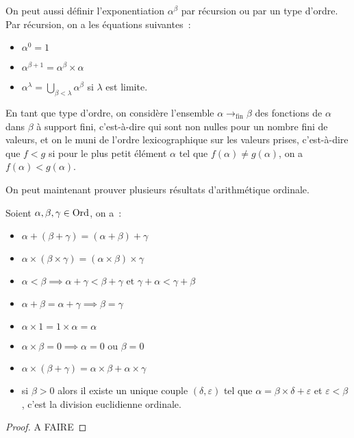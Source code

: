 On peut aussi définir l'exponentiation $\alpha^\beta$ par récursion ou par un
type d'ordre. Par récursion, on a les équations suivantes~:
\begin{itemize}
\item $\alpha^0 = 1$
\item $\alpha^{\beta+1} = \alpha^\beta \times \alpha$
\item $\alpha^\lambda = \displaystyle\bigcup_{\beta < \lambda}\alpha^\beta$
  si $\lambda$ est limite.
\end{itemize}
En tant que type d'ordre, on considère l'ensemble $\alpha\to_\mathrm{fin}\beta$
des fonctions de $\alpha$ dans $\beta$ à support fini, c'est-à-dire qui sont non
nulles pour un nombre fini de valeurs, et on le muni de l'ordre lexicographique
sur les valeurs prises, c'est-à-dire que $f < g$ si pour le plus petit élément
$\alpha$ tel que $f(\alpha)\neq g(\alpha)$, on a $f(\alpha) < g(\alpha)$.

On peut maintenant prouver plusieurs résultats d'arithmétique ordinale.

\begin{property}
  Soient $\alpha,\beta,\gamma\in\operatorname{Ord}$, on a~:
  \begin{itemize}
  \item $\alpha + (\beta + \gamma) = (\alpha + \beta) + \gamma$
  \item $\alpha\times(\beta\times\gamma) = (\alpha\times\beta)\times \gamma$
  \item $\alpha < \beta \implies \alpha + \gamma < \beta + \gamma \text{ et }
    \gamma + \alpha < \gamma + \beta$
  \item $\alpha + \beta = \alpha + \gamma \implies \beta = \gamma$
  \item $\alpha \times 1 = 1 \times \alpha = \alpha$
  \item $\alpha\times\beta = 0 \implies \alpha = 0 \text{ ou }\beta=0$
  \item $\alpha\times(\beta+\gamma) = \alpha\times\beta+\alpha\times\gamma$
  \item si $\beta > 0$ alors il existe un unique couple $(\delta,\varepsilon)$
    tel que $\alpha = \beta \times\delta + \varepsilon$ et
    $\varepsilon < \beta$, c'est la division euclidienne ordinale.
  \end{itemize}
\end{property}

\begin{proof}
  A FAIRE
\end{proof}

